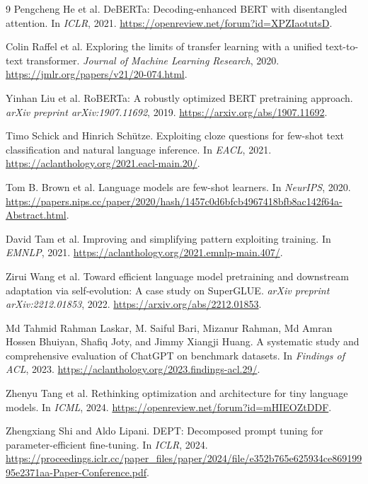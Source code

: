 \documentclass[10pt]{article}
\begin{document}
\begin{thebibliography}{9}
Pengcheng He et al.
\newblock DeBERTa: Decoding-enhanced BERT with disentangled attention.
\newblock In \emph{ICLR}, 2021.
\url{https://openreview.net/forum?id=XPZIaotutsD}.

Colin Raffel et al.
\newblock Exploring the limits of transfer learning with a unified text-to-text transformer.
\newblock \emph{Journal of Machine Learning Research}, 2020.
\url{https://jmlr.org/papers/v21/20-074.html}.

Yinhan Liu et al.
\newblock RoBERTa: A robustly optimized BERT pretraining approach.
\newblock \emph{arXiv preprint arXiv:1907.11692}, 2019.
\url{https://arxiv.org/abs/1907.11692}.

Timo Schick and Hinrich Schütze.
\newblock Exploiting cloze questions for few-shot text classification and natural language inference.
\newblock In \emph{EACL}, 2021.
\url{https://aclanthology.org/2021.eacl-main.20/}.

Tom B. Brown et al.
\newblock Language models are few-shot learners.
\newblock In \emph{NeurIPS}, 2020.
\url{https://papers.nips.cc/paper/2020/hash/1457c0d6bfcb4967418bfb8ac142f64a-Abstract.html}.

David Tam et al.
\newblock Improving and simplifying pattern exploiting training.
\newblock In \emph{EMNLP}, 2021.
\url{https://aclanthology.org/2021.emnlp-main.407/}.

Zirui Wang et al.
\newblock Toward efficient language model pretraining and downstream adaptation via self-evolution: A case study on SuperGLUE.
\newblock \emph{arXiv preprint arXiv:2212.01853}, 2022.
\url{https://arxiv.org/abs/2212.01853}.

Md Tahmid Rahman Laskar, M. Saiful Bari, Mizanur Rahman, Md Amran Hossen
Bhuiyan, Shafiq Joty, and Jimmy Xiangji Huang.
\newblock A systematic study and comprehensive evaluation of ChatGPT on
benchmark datasets.
\newblock In \emph{Findings of ACL}, 2023.
\url{https://aclanthology.org/2023.findings-acl.29/}.

Zhenyu Tang et al.
\newblock Rethinking optimization and architecture for tiny language models.
\newblock In \emph{ICML}, 2024.
\url{https://openreview.net/forum?id=mHIEOZtDDF}.

Zhengxiang Shi and Aldo Lipani.
\newblock DEPT: Decomposed prompt tuning for parameter-efficient fine-tuning.
\newblock In \emph{ICLR}, 2024.
\url{https://proceedings.iclr.cc/paper_files/paper/2024/file/e352b765e625934ce86919995e2371aa-Paper-Conference.pdf}.


\end{thebibliography}
\end{document}
